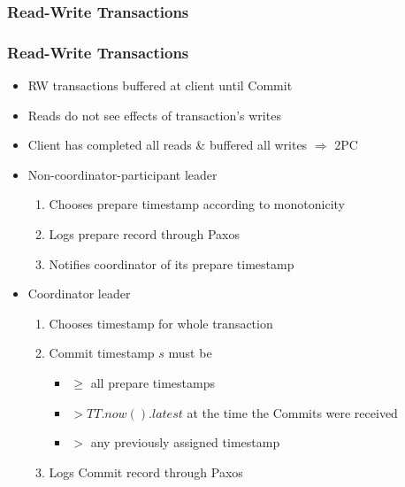 \documentclass{beamer}
\begin{document}
\subsubsection{Read-Write Transactions}
\begin{frame}
  \frametitle{Read-Write Transactions}
  \begin{itemize}
    \item{RW transactions buffered at client until Commit}
    \item{Reads do not see effects of transaction's writes}
    \item{Client has completed all reads \& buffered all writes $\Rightarrow$ 2PC}
    \pause
    \item{Non-coordinator-participant leader}
    \begin{enumerate}
      \item{Chooses prepare timestamp according to monotonicity}
      \item{Logs prepare record through Paxos}
      \item{Notifies coordinator of its prepare timestamp}
    \end{enumerate}
    \pause
    \item{Coordinator leader}
    \begin{enumerate}
      \item{Chooses timestamp for whole transaction}
      \item{Commit timestamp $s$ must be}
      \begin{itemize}
        \item{$\geq$ all prepare timestamps}
        \item{$> TT.now().latest$ at the time the Commits were received}
        \item{$>$ any previously assigned timestamp}
      \end{itemize}
      \item{Logs Commit record through Paxos}
    \end{enumerate}
  \end{itemize}
\end{frame}

\end{document}

